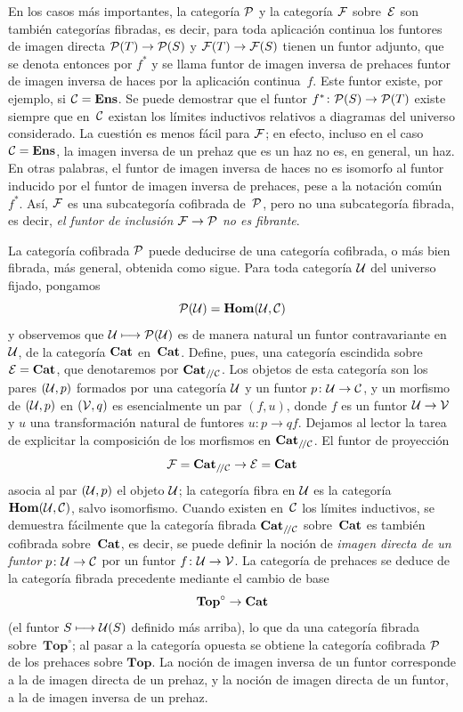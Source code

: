 \begin{enumerate}
En los casos más importantes, la categoría $\cal{P}$ y la categoría
$\cal{F}$ sobre~$\cal{E}$ son también categorías fibradas, es decir, para
toda aplicación continua los funtores de imagen directa
$\cal{P}(T)\to\cal{P}(S)$ y $\cal{F}(T)\to\cal{F}(S)$ tienen un funtor
adjunto, que se denota entonces por $f^*$ y se llama funtor de imagen
inversa de prehaces \resp funtor de imagen inversa de haces por la
aplicación continua~$f$. Este funtor existe, por ejemplo, si
$\cal{C}=\Ens$. Se puede demostrar que el funtor
$f^*\colon\cal{P}(S)\to\cal{P}(T)$ existe siempre que en~$\cal{C}$
existan los límites inductivos relativos a diagramas del universo
considerado. La cuestión es menos fácil para $\cal{F}$; en efecto, incluso
en el caso $\cal{C}=\Ens$, la imagen inversa de un prehaz que es un haz no
es, en general, un haz. En otras palabras, el funtor de imagen inversa de
haces no es isomorfo al funtor inducido por el funtor de imagen inversa de
prehaces, pese a la notación común $f^*$. Así, $\cal{F}$ es una
subcategoría cofibrada de~$\cal{P}$, pero no una subcategoría fibrada, es
decir, \emph{el funtor de inclusión $\cal{F}\to\cal{P}$ no es fibrante}.

La categoría cofibrada $\cal{P}$ puede deducirse de una categoría
cofibrada, o más bien fibrada, más general, obtenida como sigue. Para toda
categoría $\cal{U}$ del universo fijado, pongamos
$$
\cal{P}(\cal{U})=\SheafHom(\cal{U},\cal{C})
$$
y
observemos que $\cal{U}\mto\cal{P}(\cal{U})$ es de manera natural un
funtor contravariante en~$\cal{U}$, de la categoría $\Cat$ en~$\Cat$.
Define, pues, una categoría escindida sobre~$\cal{E}=\Cat$, que denotaremos
por $\Cat_{/\!/\cal{C}}$. Los objetos de esta categoría son los pares
$(\cal{U},p)$ formados por una categoría $\cal{U}$ y un funtor
$p\colon\cal{U}\to\cal{C}$, y un morfismo de $(\cal{U},p)$ en
$(\cal{V},q)$ es esencialmente un par $(f,u)$, donde $f$ es un funtor
$\cal{U}\to\cal{V}$ y $u$ una transformación natural de funtores
$u\colon p\to qf$. Dejamos al lector la tarea de explicitar la composición
de los morfismos en $\Cat_{/\!/\cal{C}}$. El funtor de proyección
$$
\cal{F}=\Cat_{/\!/\cal{C}}\to\cal{E}=\Cat
$$
asocia al par $(\cal{U},p)$ el objeto $\cal{U}$; la categoría fibra en
$\cal{U}$ es la categoría $\SheafHom(\cal{U},\cal{C})$, salvo isomorfismo.
Cuando existen en~$\cal{C}$ los límites inductivos, se demuestra fácilmente
que la categoría fibrada $\Cat_{/\!/\cal{C}}$ sobre~$\Cat$ es también
cofibrada sobre~$\Cat$, es decir, se puede definir la noción de
\emph{imagen directa de un funtor} $p\colon\cal{U}\to\cal{C}$ por un
funtor $f\colon\cal{U}\to\cal{V}$. La categoría de prehaces se deduce de
la categoría fibrada precedente mediante el cambio de base
$$
\mathbf{Top}^\circ\to\Cat
$$
(el funtor $S\mto\cal{U}(S)$ definido más arriba), lo que da una categoría
fibrada sobre~$\mathbf{Top}^\circ$; al pasar a la categoría opuesta se
obtiene la categoría cofibrada $\cal{P}$ de los prehaces sobre
$\mathbf{Top}$. La noción de imagen inversa de un funtor corresponde a la
de imagen directa de un prehaz, y la noción de imagen directa de un funtor,
a la de imagen inversa de un prehaz.


\end{enumerate}
